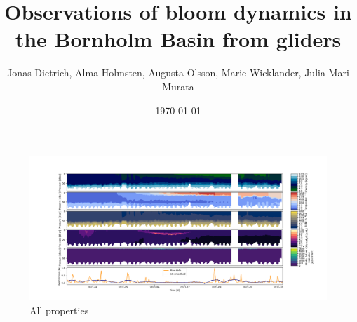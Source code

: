 \documentclass{article}
\title{Observations of bloom dynamics in the Bornholm Basin from gliders}
\author{Jonas Dietrich, Alma Holmsten, Augusta Olsson, Marie Wicklander, Julia Mari Murata}
\date{\today}
\begin{document}
\maketitle



\begin{multicols}{2}



\end{multicols}

\begin{figure}[H]
  \centering
    \includegraphics[width=\textwidth]{All_Properties.png}
  \caption{All properties}
  \label{fig:all}
\end{figure}

\begin{multicols}{2}


\printbibliography
\end{multicols}


%
\end{document}

